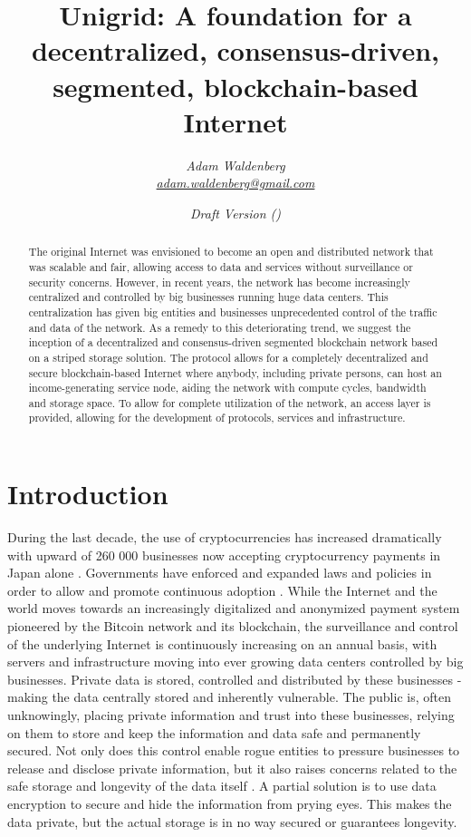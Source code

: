 \documentclass[10pt,a4paper,final]{article}
\author{\textit{Adam Waldenberg\\\href{mailto:adam.waldenberg@gmail.com}{adam.waldenberg@gmail.com}}}
\affil{Stiftelsen The Unigrid Foundation\\\href{mailto:info@unigridfoundation.se}{info@unigridfoundation.se}\\\href{http://www.unigrid.org}{www.unigrid.org}}
\title{Unigrid: A foundation for a decentralized, consensus-driven, segmented, blockchain-based Internet}
\date{\emph{Draft Version \gitRel\hspace{5pt}(\gitCommitterDate)}}
\begin{document}
\maketitle

\begin{abstract}
\noindent The original Internet was envisioned to become an open and distributed network that was scalable and fair, allowing access to data and services without surveillance or security concerns. However, in recent years, the network has become increasingly centralized and controlled by big businesses running huge data centers. This centralization has given big entities and businesses unprecedented control of the traffic and data of the network.
As a remedy to this deteriorating trend, we suggest the inception of a decentralized and consensus-driven segmented blockchain network based on a striped storage solution. The protocol allows for a completely decentralized and secure blockchain-based Internet where anybody, including private persons, can host an income-generating service node, aiding the network with compute cycles, bandwidth and storage space. To allow for complete utilization of the network, an access layer is provided, allowing for the development of protocols, services and infrastructure.
\end{abstract}

\section{Introduction}
During the last decade, the use of cryptocurrencies has increased dramatically with upward of 260 000 businesses now accepting cryptocurrency payments in Japan alone \cite{53companies2018}. Governments have enforced and expanded laws and policies in order to allow and promote continuous adoption \cite{japan2017}. While the Internet and the world moves towards an increasingly digitalized \cite{ekrona2019} and anonymized payment system pioneered by the Bitcoin network \cite{bitcoin2008} and its blockchain, the surveillance and control of the underlying Internet is continuously increasing on an annual basis, with servers and infrastructure moving into ever growing data centers controlled by big businesses. Private data is stored, controlled and distributed by these businesses - making the data centrally stored and inherently vulnerable. The public is, often unknowingly, placing private information and trust into these businesses, relying on them to store and keep the information and data safe and permanently secured. Not only does this control enable rogue entities to pressure businesses to release and disclose private information, but it also raises concerns related to the safe storage and longevity of the data itself \cite{guardian2017,facebook2018}. A partial solution is to use data encryption to secure and hide the information from prying eyes. This makes the data private, but the actual storage is in no way secured or guarantees longevity.
\end{document}
